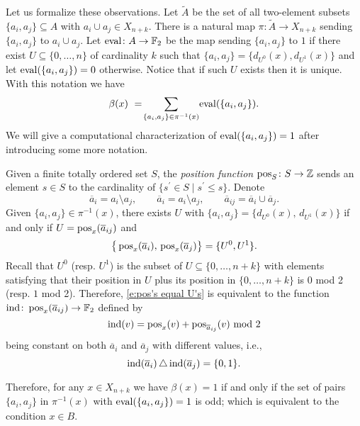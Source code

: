 Let us formalize these observations.
Let $\widetilde{A}$ be the set of all two-element subsets $\{a_i, a_j\} \subseteq A$ with $a_i \cup a_j \in X_{n+k}$.
There is a natural map $\pi \colon \widetilde{A} \to X_{n+k}$ sending $\{a_i, a_j\}$ to $a_i \cup a_j$.
Let $\operatorname{eval} \colon A \to \mathbb{F}_2$ be the map sending $\{a_i, a_j\}$ to $1$ if there exist $U \subseteq \{0,\dots,n\}$ of cardinality $k$ such that $\{a_i, a_j\} = \{d_{U^0}(x), d_{U^1}(x)\}$ and let $\operatorname{eval}(\{a_i, a_j\}) = 0$ otherwise.
Notice that if such $U$ exists then it is unique.
With this notation we have
\begin{equation*}
\beta(x) \ = \! \sum_{\{a_i, a_j\} \in \pi^{-1}(x)} \! \operatorname{eval}(\{a_i, a_j\}).
\end{equation*}
We will give a computational characterization of $\operatorname{eval}(\{a_i, a_j\}) = 1$ after introducing some more notation.

Given a finite totally ordered set $S$, the \textit{position function} $\operatorname{pos}_S \colon S \to \mathbb{Z}$ sends an element $s \in S$ to the cardinality of $\{s^\prime \in S \mid s^\prime \leq s\}$.
Denote
\begin{equation*}
\overline{a}_{i} = a_i \setminus a_j, \qquad
\overline{a}_{i} = a_i \setminus a_j, \qquad
\overline{a}_{ij} = \overline{a}_i \cup \overline{a}_j.
\end{equation*}
Given $\{a_i, a_j\} \in \pi^{-1}(x)$, there exists $U$ with $\{a_i, a_j\} = \{d_{U^0}(x),\, d_{U^1}(x)\}$
if and only if $U = \operatorname{pos}_{x}(\overline{a}_{ij})$ and
\begin{equation} \label{e:pos's equal U's}
\big\{\operatorname{pos}_{x}(\overline{a}_i),\, \operatorname{pos}_{x}(\overline{a}_j)\big\} = \{U^0, U^1\}.
\end{equation}
Recall that $U^0$ (resp. $U^1$) is the subset of $U \subseteq \{0, \dots, n+k\}$ with elements satisfying that their position in $U$ plus its position in $\{0, \dots, n+k\}$ is $0$ mod 2 (resp. $1$ mod 2).
Therefore, \eqref{e:pos's equal U's} is equivalent to the function $\mathrm{ind} \colon \operatorname{pos}_x(\overline{a}_{ij}) \to \mathbb{F}_2$ defined by
\begin{equation*}
\mathrm{ind}(v) = \operatorname{pos}_{x}(v) + \operatorname{pos}_{\overline{a}_{ij}}(v) \text{ mod }2
\end{equation*}
being constant on both $\overline{a}_i$ and $\overline{a}_j$ with different values, i.e., 
\begin{equation*}
\mathrm{ind}(\overline{a}_i) \operatorname{\triangle} \mathrm{ind}(\overline{a}_j) = \{0,1\}.
\end{equation*}

Therefore, for any $x \in X_{n+k}$ we have $\beta(x) = 1$ if and only if the set of pairs $\{a_i, a_j\}$ in $\pi^{-1}(x)$ with $\operatorname{eval}(\{a_i, a_j\}) = 1$ is odd; which is equivalent to the condition $x \in B$.